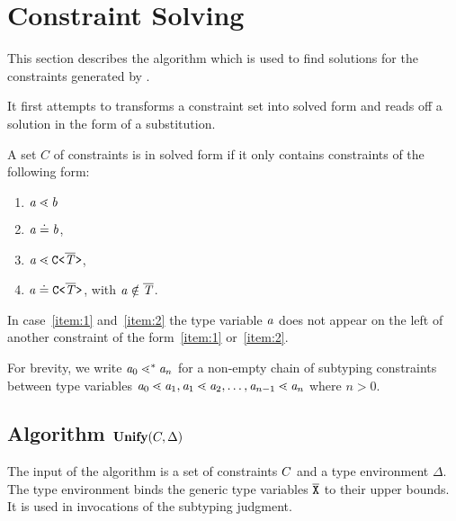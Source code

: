 \section{Constraint Solving}
\label{sec:unify}

This section describes the \unify{} algorithm
which is used to find solutions for the constraints generated by \fjtype{}.

It first attempts to transforms a constraint set into solved form and
reads off a solution in the form of a substitution.

\begin{definition}\label{def:solved-form}
  A set $C$ of constraints is in solved form if it only contains
  constraints of  the following form:
  \begin{enumerate}
  \item $\mathit{ a } \lessdot \mathit{ b }$ %
  \item $\mathit{ a } \doteq \mathit{ b }$,
  \item\label{item:1} $\mathit{ a } \lessdot \mathtt{C \texttt{<} \overline{\tt \mathit{T}} \texttt{>} }$, 
  \item\label{item:2} $\mathit{ a } \doteq \mathtt{C \texttt{<} \overline{\tt \mathit{T}} \texttt{>} }$, with $\mathit{ a } \notin \overline{\tt \mathit{T}}$.
  \end{enumerate}
  In case~\ref{item:1} and~\ref{item:2} the type variable $\mathit{ a }$ does not appear on the left of another constraint of the
  form~\ref{item:1} or~\ref{item:2}.
\end{definition}  

For brevity, we write $\mathit{ a }_0 \lessdot^* \mathit{ a }_n$ for a non-empty chain of subtyping constraints between type variables $\mathit{ a }_0 \lessdot
\mathit{ a }_1, \mathit{ a }_1 \lessdot \mathit{ a }_2, \dots, \mathit{ a }_{n-1} \lessdot \mathit{ a }_n$ where $n>0$.

\subsection{{Algorithm $\textbf{Unify}{} (C, \Delta)$}}


The input of the algorithm is a set of constraints $C$ and a
type environment $\Delta$. The type environment binds the generic type
variables $\overline{\tt X}$ to their upper bounds. It is used in invocations of
the subtyping judgment.

